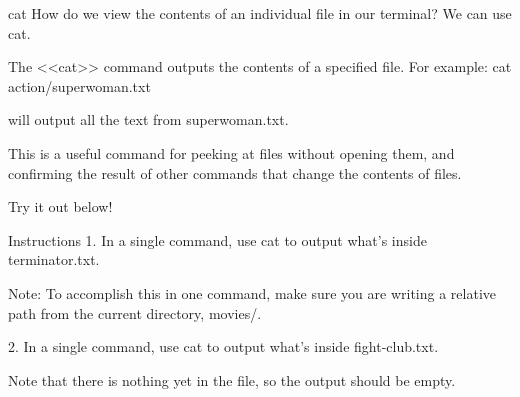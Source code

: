 cat
    How do we view the contents of an individual file in our terminal? We can use cat.

    The <<cat>> command outputs the contents of a specified file. For example:
        cat action/superwoman.txt
    
    will output all the text from superwoman.txt.

    This is a useful command for peeking at files without opening them, and confirming the result of other commands that change the contents of files.

    Try it out below!

Instructions
    1.
    In a single command, use cat to output what’s inside terminator.txt.

    Note: To accomplish this in one command, make sure you are writing a relative path from the current directory, movies/.

    2.
    In a single command, use cat to output what’s inside fight-club.txt.

    Note that there is nothing yet in the file, so the output should be empty.